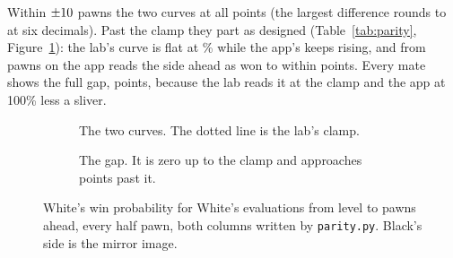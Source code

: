 \documentclass[11pt]{article}
\begin{document}
Within $\pm10$ pawns the two curves \SharedAgrees{} at all \SharedPoints{} points
(the largest difference rounds to \SharedMaxGap{} at six decimals). Past the clamp they part as
designed (Table~\ref{tab:parity}, Figure~\ref{fig:curves}): the lab's curve is flat at
\LabCeiling\% while the app's keeps rising, and from \WonAtPawns{} pawns on the app reads the side
ahead as won to within \WonWithin{} points. Every mate shows the full gap, \MaxGap{} points, because
the lab reads it at the clamp and the app at 100\% less a sliver.

\begin{table}[!htbp]
\centering\small
\ParityTable
\caption{White's win probability in the lab and in the app, in percentage points: the largest gap
in each range, the first evaluation where it occurs, and the two readings there. Within the lab's
clamp the gap is zero at every point.}
\label{tab:parity}
\end{table}

\begin{figure}[!htbp]
\centering
\begin{subfigure}{0.49\textwidth}\centering
{}
\caption{The two curves. The dotted line is the lab's clamp.}
\end{subfigure}\hfill
\begin{subfigure}{0.49\textwidth}\centering
{}
\caption{The gap. It is zero up to the clamp and approaches \MaxGap{} points past it.}
\end{subfigure}
\caption{White's win probability for White's evaluations from level to \FigurePawns{} pawns ahead, every half
pawn, both columns written by \texttt{parity.py}. Black's side is the mirror image.}
\label{fig:curves}
\end{figure}
\end{document}
